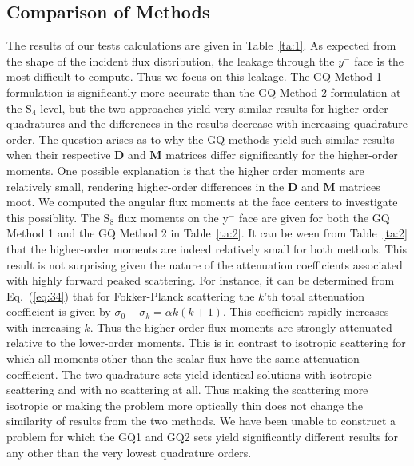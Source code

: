 \documentclass[12pt]{article}
\newcommand{\EQ}[1]{Eq.~(\ref{eq:#1})}
\newcommand{\TA}[1]{Table~\ref{ta:#1}}
\newcommand{\mD}{\mathbf{D}}
\newcommand{\mM}{\mathbf{M}}
\begin{document}
\begin{center}
\subsection{Comparison of Methods}
The results of our tests calculations are given in \TA{1}.  
As expected from the shape of the incident flux distribution, the leakage through the $y^-$ face is the most difficult to compute.  
Thus we focus on this leakage.  The  GQ Method 1 formulation is significantly more accurate than the 
GQ Method 2 formulation at the S$_4 $ level, but the two approaches yield very similar results for higher order quadratures and the differences 
in the results decrease with increasing quadrature order. The question arises as to why the GQ methods yield such similar results when 
their respective $\mD$ and $\mM$ matrices differ significantly for the higher-order moments.  One possible explanation is that the 
higher order moments are relatively small, rendering higher-order differences in the $\mD$ and $\mM$ matrices moot.  We computed the angular 
flux moments at the face centers to investigate this possiblity.  The S$_8$ flux moments on the 
y$^{-}$ face are given for both the GQ Method 1 and the GQ Method 2 in \TA{2}.  It can be ween from \TA{2} that the higher-order moments are 
indeed relatively small for both methods.  This result is not surprising given the nature of the attenuation coefficients associated with 
highly forward peaked scattering.  For instance, it can be determined from \EQ{34} that for Fokker-Planck scattering  
the $k$'th total attenuation coefficient is given by $\sigma_0-\sigma_k = \alpha k(k+1)$.  This coefficient rapidly increases 
with increasing $k$.  Thus the higher-order flux moments are strongly attenuated relative to the lower-order moments.  This is in contrast 
to isotropic scattering for which all moments other than the scalar flux have the same attenuation coefficient.  The two quadrature sets yield 
identical solutions with isotropic scattering and with no scattering at all.  Thus making the scattering more isotropic or making the 
problem more optically thin does not change the similarity of results from the two methods.  We have been unable to construct a problem for 
which the GQ1 and GQ2 sets yield significantly different results for any other than the very lowest quadrature orders. 



\end{center}
\end{document}

